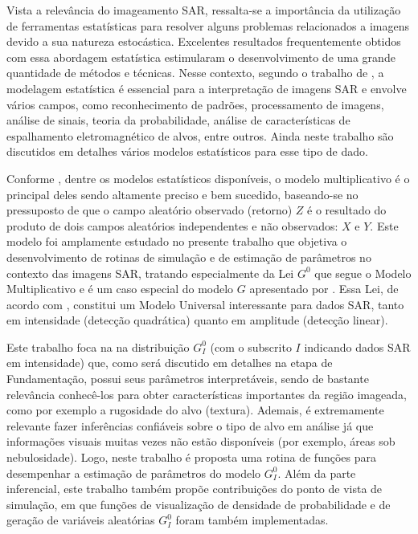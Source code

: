 Vista a relevância do imageamento SAR, ressalta-se a importância da utilização de ferramentas estatísticas para resolver alguns problemas relacionados a imagens devido a sua natureza estocástica. 
Excelentes resultados frequentemente obtidos com essa abordagem estatística estimularam o desenvolvimento de uma grande quantidade de métodos e técnicas. 
Nesse contexto, segundo o trabalho de \citet{Gao2010StatisticalMO}, a modelagem estatística é essencial para a interpretação de imagens SAR e envolve vários campos, como reconhecimento de padrões, processamento de imagens, análise de sinais, teoria da probabilidade, análise de características de espalhamento eletromagnético de alvos, entre outros. 
Ainda neste trabalho são discutidos em detalhes vários modelos estatísticos para esse tipo de dado.

Conforme \citet{Mejail2002}, dentre os modelos estatísticos disponíveis, o modelo multiplicativo é o principal deles sendo altamente preciso e bem sucedido, baseando-se no pressuposto de que o campo aleatório observado (retorno) $Z$ é o resultado do produto de dois campos aleatórios independentes e não observados: $X$ e $Y$. 
Este modelo foi amplamente estudado no presente trabalho que objetiva o desenvolvimento de rotinas de simulação e de estimação de parâmetros no contexto das imagens SAR, tratando especialmente da Lei $G^{0}$ que segue o Modelo Multiplicativo e é um caso especial do modelo $G$ apresentado por \citet{Clutter1997}. Essa Lei, de acordo com \citet{FreryMinute2004}, constitui um Modelo Universal interessante para dados SAR, tanto em intensidade (detecção quadrática) quanto em amplitude (detecção linear).

Este trabalho foca na na distribuição $G_I^0$ (com o subscrito $I$ indicando dados SAR em intensidade) que, como será discutido em detalhes na etapa de Fundamentação, possui seus parâmetros interpretáveis, sendo de bastante relevância conhecê-los para obter características importantes da região imageada, como por exemplo a rugosidade do alvo (textura). 
Ademais, é extremamente relevante fazer inferências confiáveis sobre o tipo de alvo em análise já que informações visuais muitas vezes não estão disponíveis (por exemplo, áreas sob nebulosidade). 
Logo, neste trabalho é proposta uma rotina de funções para desempenhar a estimação de parâmetros do modelo $G_I^0$. 
Além da parte inferencial, este trabalho também propõe contribuições do ponto de vista de simulação, em que funções de visualização de densidade de probabilidade e de geração de variáveis aleatórias $G_I^0$ foram também implementadas. 

